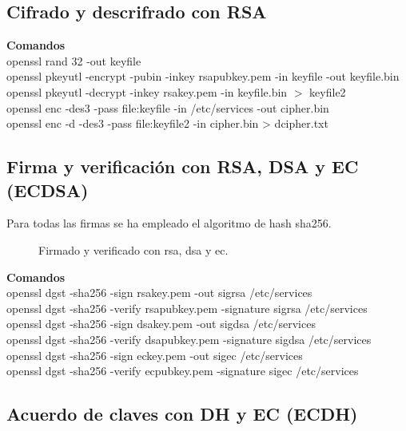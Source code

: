 \documentclass[11pt]{article}
\begin{document}
    \subsection{Cifrado y descrifrado con RSA}
      \par
      \textbf{Comandos}\\
      openssl rand 32 -out keyfile\\
      openssl pkeyutl -encrypt -pubin -inkey rsapubkey.pem -in keyfile -out keyfile.bin\\
      openssl pkeyutl -decrypt -inkey rsakey.pem -in keyfile.bin $>$ keyfile2\\
      openssl enc -des3 -pass file:keyfile -in /etc/services -out cipher.bin\\
      openssl enc -d -des3 -pass file:keyfile2 -in cipher.bin > dcipher.txt


    \subsection{Firma y verificación con RSA, DSA y EC (ECDSA)}
      \par
      Para todas las firmas se ha empleado el algoritmo de hash sha256.
      
      \begin{figure}[!ht]
        \centering
        \caption{Firmado y verificado con rsa, dsa y ec.}
      \end{figure}

      \par
      \textbf{Comandos}\\
      openssl dgst -sha256 -sign rsakey.pem -out sigrsa /etc/services\\
      openssl dgst -sha256 -verify rsapubkey.pem -signature sigrsa /etc/services\\
      \vspace{2mm}
      openssl dgst -sha256 -sign dsakey.pem -out sigdsa /etc/services\\
      openssl dgst -sha256 -verify dsapubkey.pem -signature sigdsa /etc/services\\
      \vspace{2mm}
      openssl dgst -sha256 -sign eckey.pem -out sigec /etc/services\\
      openssl dgst -sha256 -verify ecpubkey.pem -signature sigec /etc/services\\


    \subsection{Acuerdo de claves con DH y EC (ECDH)} \label{ecdh}
    
\end{document}
